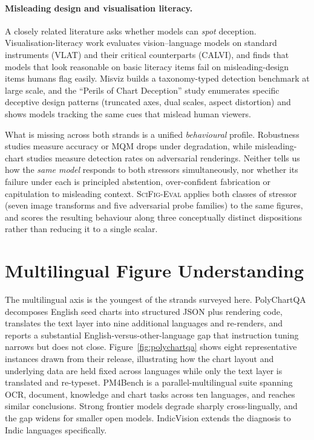 \paragraph{Misleading design and visualisation literacy.} A closely
related literature asks whether models can \emph{spot} deception.
Visualisation-literacy work \citep{pandey2025calvi} evaluates
vision--language models on standard instruments (VLAT) and their
critical counterparts (CALVI), and finds that models that look
reasonable on basic literacy items fail on misleading-design items
humans flag easily. Misviz \citep{tonglet2025misviz} builds a
taxonomy-typed detection benchmark at large scale, and the ``Perils
of Chart Deception'' study \citep{chartdeception2025} enumerates
specific deceptive design patterns (truncated axes, dual scales,
aspect distortion) and shows models tracking the same cues that
mislead human viewers.

What is missing across both strands is a unified \emph{behavioural}
profile. Robustness studies measure accuracy or MQM drops under
degradation, while misleading-chart studies measure detection rates
on adversarial renderings. Neither tells us how the \emph{same model}
responds to both stressors simultaneously, nor whether its failure
under each is principled abstention, over-confident fabrication or
capitulation to misleading context. \textsc{SciFig-Eval} applies
both classes of stressor (seven image transforms and five
adversarial probe families) to the same figures, and scores the
resulting behaviour along three conceptually distinct dispositions rather
than reducing it to a single scalar.

\section{Multilingual Figure Understanding}
\label{sec:lit-multiling}

The multilingual axis is the youngest of the strands surveyed here.
PolyChartQA \citep{li2025polychart} decomposes English seed charts
into structured JSON plus rendering code, translates the text layer
into nine additional languages and re-renders, and reports a
substantial English-versus-other-language gap that instruction
tuning narrows but does not close. Figure~\ref{fig:polychartqa}
shows eight representative instances drawn from their release,
illustrating how the chart layout and underlying data are held
fixed across languages while only the text layer is translated and
re-typeset. PM4Bench
\citep{gao2025pm4bench} is a parallel-multilingual suite spanning
OCR, document, knowledge and chart tasks across ten languages, and
reaches similar conclusions. Strong frontier models degrade sharply
cross-lingually, and the gap widens for smaller open models.
IndicVision \citep{sharma2025indicvision} extends the diagnosis to
Indic languages specifically.

